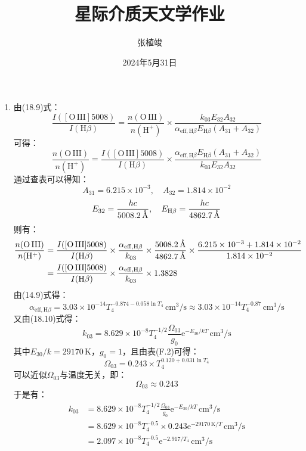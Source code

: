 \documentclass[a4paper,fontset=none]{ctexart}
\title{\textbf{星际介质天文学作业}}
\author{张植竣}
\date{2024年5月31日}
\newcommand{\ang}{\text{\r{A}}}
\begin{document}
\maketitle

\begin{enumerate}
    \item[18.1]
    由(18.9)式：
    \[
        \frac{I([\mathrm{O\,III}]5008)}{I(\mathrm{H}\beta)} = \frac{n(\mathrm{O\,III})}{n(\mathrm{H^+})} \times \frac{k_{03} E_{32} A_{32}}{\alpha_{\mathrm{eff, H}\beta} E_{\mathrm{H}\beta} (A_{31} + A_{32})}
    \]
    可得：
    \[
        \frac{n(\mathrm{O\,III})}{n(\mathrm{H^+})} = \frac{I([\mathrm{O\,III}]5008)}{I(\mathrm{H}\beta)} \times \frac{\alpha_{\mathrm{eff, H}\beta} E_{\mathrm{H}\beta} (A_{31} + A_{32})}{k_{03} E_{32} A_{32}}
    \]
    通过查表可以得知：
    \[
        A_{31} = 6.215 \times 10^{-3},\quad A_{32} = 1.814 \times 10^{-2}
    \]
    \[
        E_{32} = \frac{hc}{5008.2\,\ang},\quad E_{\mathrm{H}\beta} = \frac{hc}{4862.7\,\ang}
    \]
    则有：
    \begin{align*}
        \frac{n(\mathrm{O\,III})}{n(\mathrm{H^+})}
        &= \frac{I([\mathrm{O\,III}]5008)}{I(\mathrm{H}\beta)} \times \frac{\alpha_{\mathrm{eff, H}\beta}}{k_{03}} \times \frac{5008.2\,\ang}{4862.7\,\ang} \times \frac{6.215 \times 10^{-3} + 1.814 \times 10^{-2}}{1.814 \times 10^{-2}} \\
        &= \frac{I([\mathrm{O\,III}]5008)}{I(\mathrm{H}\beta)} \times \frac{\alpha_{\mathrm{eff, H}\beta}}{k_{03}} \times 1.3828
    \end{align*}
    由(14.9)式得：
    \[
        \alpha_{\mathrm{eff, H}\beta} = 3.03 \times 10^{-14} T_4^{-0.874-0.058\ln{T_4}}\,\mathrm{cm^3/s} \approx 3.03 \times 10^{-14} T_4^{-0.87}\,\mathrm{cm^3/s}
    \]
    又由(18.10)式得：
    \[
        k_{03} = 8.629 \times 10^{-8} T_4^{-1/2} \frac{\Omega_{03}}{g_0} \mathrm{e}^{-E_{30}/kT}\,\mathrm{cm^3/s}
    \]
    其中$E_{30}/k = 29170\,\mathrm{K}$，$g_0 = 1$，且由表(F.2)可得：
    \[
        \Omega_{03} = 0.243 \times T_4^{0.120+0.031\ln{T_4}}
    \]
    可以近似$\Omega_{03}$与温度无关，即：
    \[
        \Omega_{03} \approx 0.243
    \]
    于是有：
    \begin{align*}
        k_{03}
        &= 8.629 \times 10^{-8} T_4^{-1/2} \frac{\Omega_{03}}{g_0} \mathrm{e}^{-E_{30}/kT}\,\mathrm{cm^3/s} \\
        &= 8.629 \times 10^{-8} T_4^{-0.5} \times 0.243 \mathrm{e}^{-29170\,\mathrm{K}/T}\,\mathrm{cm^3/s} \\
        &= 2.097 \times 10^{-8} T_4^{-0.5} \mathrm{e}^{-2.917/T_4}\,\mathrm{cm^3/s}

\end{align*}
\end{enumerate}
\end{document}
